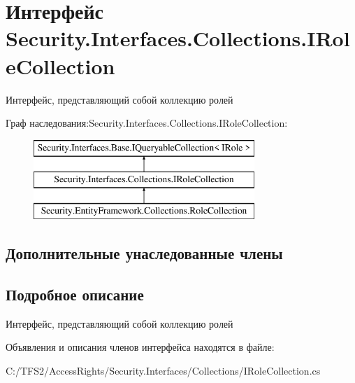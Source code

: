 \hypertarget{interface_security_1_1_interfaces_1_1_collections_1_1_i_role_collection}{}\section{Интерфейс Security.\+Interfaces.\+Collections.\+I\+Role\+Collection}
\label{interface_security_1_1_interfaces_1_1_collections_1_1_i_role_collection}


Интерфейс, представляющий собой коллекцию ролей  


Граф наследования\+:Security.\+Interfaces.\+Collections.\+I\+Role\+Collection\+:\begin{figure}[H]
\begin{center}
\leavevmode
\includegraphics[height=3.000000cm]{db/d60/interface_security_1_1_interfaces_1_1_collections_1_1_i_role_collection}
\end{center}
\end{figure}
\subsection*{Дополнительные унаследованные члены}


\subsection{Подробное описание}
Интерфейс, представляющий собой коллекцию ролей 



Объявления и описания членов интерфейса находятся в файле\+:\begin{DoxyCompactItemize}
\item 
C\+:/\+T\+F\+S2/\+Access\+Rights/\+Security.\+Interfaces/\+Collections/I\+Role\+Collection.\+cs\end{DoxyCompactItemize}
